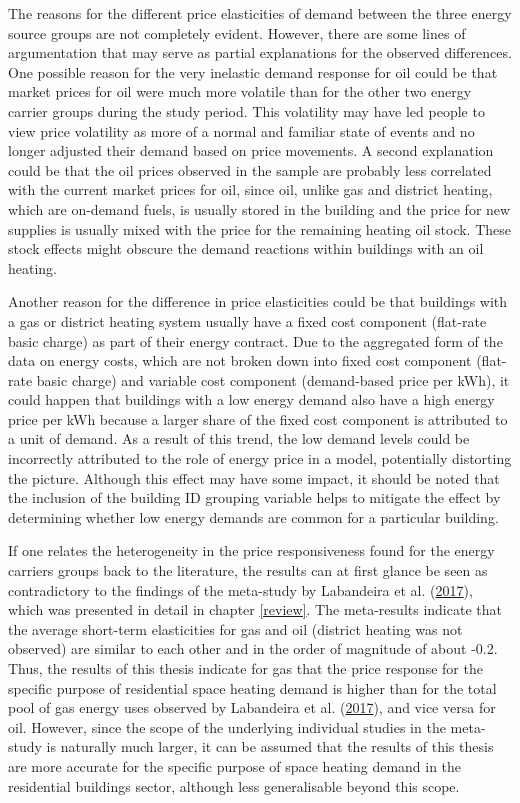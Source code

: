\documentclass[12pt,twoside]{reedthesis}
\begin{document}
The reasons for the different price elasticities of demand between the three energy source groups are not completely evident. However, there are some lines of argumentation that may serve as partial explanations for the observed differences. One possible reason for the very inelastic demand response for oil could be that market prices for oil were much more volatile than for the other two energy carrier groups during the study period. This volatility may have led people to view price volatility as more of a normal and familiar state of events and no longer adjusted their demand based on price movements. A second explanation could be that the oil prices observed in the sample are probably less correlated with the current market prices for oil, since oil, unlike gas and district heating, which are on-demand fuels, is usually stored in the building and the price for new supplies is usually mixed with the price for the remaining heating oil stock. These stock effects might obscure the demand reactions within buildings with an oil heating.

Another reason for the difference in price elasticities could be that buildings with a gas or district heating system usually have a fixed cost component (flat-rate basic charge) as part of their energy contract. Due to the aggregated form of the data on energy costs, which are not broken down into fixed cost component (flat-rate basic charge) and variable cost component (demand-based price per kWh), it could happen that buildings with a low energy demand also have a high energy price per kWh because a larger share of the fixed cost component is attributed to a unit of demand. As a result of this trend, the low demand levels could be incorrectly attributed to the role of energy price in a model, potentially distorting the picture. Although this effect may have some impact, it should be noted that the inclusion of the building ID grouping variable helps to mitigate the effect by determining whether low energy demands are common for a particular building.

If one relates the heterogeneity in the price responsiveness found for the energy carriers groups back to the literature, the results can at first glance be seen as contradictory to the findings of the meta-study by Labandeira et al. (\protect\hyperlink{ref-labandeira_etal17}{2017}), which was presented in detail in chapter \ref{review}. The meta-results indicate that the average short-term elasticities for gas and oil (district heating was not observed) are similar to each other and in the order of magnitude of about -0.2. Thus, the results of this thesis indicate for gas that the price response for the specific purpose of residential space heating demand is higher than for the total pool of gas energy uses observed by Labandeira et al. (\protect\hyperlink{ref-labandeira_etal17}{2017}), and vice versa for oil. However, since the scope of the underlying individual studies in the meta-study is naturally much larger, it can be assumed that the results of this thesis are more accurate for the specific purpose of space heating demand in the residential buildings sector, although less generalisable beyond this scope.
\end{document}

